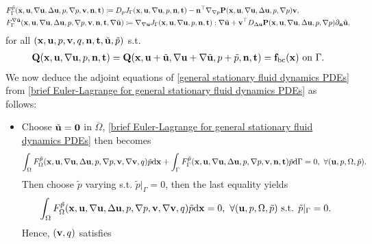 \documentclass[oneside]{book}
\numberwithin{equation}{section}
\begin{document}
\begin{itemize}[leftmargin=0in]
\begin{align*}
        &F_\Gamma^{\tilde{p}}({\bf x},{\bf u},\nabla{\bf u},\Delta{\bf u},p,\nabla p,{\bf v},{\bf n},{\bf t})\coloneqq D_pJ_\Gamma({\bf x},{\bf u},\nabla{\bf u},p,{\bf n},{\bf t}) - {\bf n}^\top\nabla_{\nabla p}{\bf P}({\bf x},{\bf u},\nabla{\bf u},\Delta{\bf u},p,\nabla p){\bf v},\\
        &F_\Gamma^{\nabla\tilde{\bf u}}({\bf x},{\bf u},\nabla{\bf u},\Delta{\bf u},p,\nabla p,{\bf v},{\bf n},{\bf t},\nabla\tilde{\bf u})\coloneqq\nabla_{\nabla{\bf u}}J_\Gamma({\bf x},{\bf u},\nabla{\bf u},p,{\bf n},{\bf t}):\nabla\tilde{\bf u} + {\bf v}^\top D_{\Delta{\bf u}}{\bf P}({\bf x},{\bf u},\nabla{\bf u},\Delta{\bf u},p,\nabla p)\partial_{\bf n}\tilde{\bf u},
    \end{align*}
    for all $({\bf x},{\bf u},p,{\bf v},q,{\bf n},{\bf t},\tilde{\bf u},\tilde{p})$ s.t.
    \begin{align*}
        {\bf Q}({\bf x},{\bf u},\nabla{\bf u},p,{\bf n},{\bf t}) = {\bf Q}({\bf x},{\bf u} + \tilde{\bf u},\nabla{\bf u} + \nabla\tilde{\bf u},p + \tilde{p},{\bf n},{\bf t}) = {\bf f}_{\rm bc}({\bf x}) \mbox{ on } \Gamma.
    \end{align*}    
    We now deduce the adjoint equations of \eqref{general stationary fluid dynamics PDEs} from \eqref{brief Euler-Lagrange for general stationary fluid dynamics PDEs} as follows:
    \begin{itemize}
        \item Choose $\tilde{\bf u} = {\bf 0}$ in $\overline{\Omega}$, \eqref{brief Euler-Lagrange for general stationary fluid dynamics PDEs} then becomes
        \begin{align*}
            \int_\Omega F_\Omega^{\tilde{p}}({\bf x},{\bf u},\nabla{\bf u},\Delta{\bf u},p,\nabla p,{\bf v},\nabla{\bf v},q)\tilde{p}{\rm d}{\bf x} + \int_\Gamma F_\Gamma^{\tilde{p}}({\bf x},{\bf u},\nabla{\bf u},\Delta{\bf u},p,\nabla p,{\bf v},{\bf n},{\bf t})\tilde{p}{\rm d}\Gamma = 0,\ \forall({\bf u},p,\Omega,\tilde{p}).
        \end{align*}
        Then choose $\tilde{p}$ varying s.t. $\tilde{p}|_\Gamma = 0$, then the last equality yields
        \begin{align*}
            \int_\Omega F_\Omega^{\tilde{p}}({\bf x},{\bf u},\nabla{\bf u},\Delta{\bf u},p,\nabla p,{\bf v},\nabla{\bf v},q)\tilde{p}{\rm d}{\bf x} = 0,\ \forall({\bf u},p,\Omega,\tilde{p}) \mbox{ s.t. } \tilde{p}|_\Gamma = 0.
        \end{align*}
        Hence, $({\bf v},q)$ satisfies
        \begin{align}

\end{align}
\end{itemize}
\end{itemize}
\end{document}
